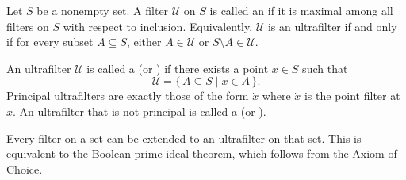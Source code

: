 \begin{definition} \label{definition:ultrafilter_on_a_set}

    Let $S$ be a nonempty set. A filter $\mathcal{U}$ on $S$ is called an  if it is maximal among all filters on $S$ with respect to inclusion. Equivalently, $\mathcal{U}$ is an ultrafilter if and only if for every subset $A \subseteq S$, either $A \in \mathcal{U}$ or $S \setminus A \in \mathcal{U}$.

    An ultrafilter $\mathcal{U}$ is called a  (or ) if there exists a point $x \in S$ such that
    $$\mathcal{U} = \{\, A \subseteq S \mid x \in A \,\}.$$
    Principal ultrafilters are exactly those of the form $\dot{x}$ where $\dot{x}$ is the point filter at $x$. An ultrafilter that is not principal is called a  (or ).

    Every filter on a set can be extended to an ultrafilter on that set. This is equivalent to the Boolean prime ideal theorem, which follows from the Axiom of Choice.
\end{definition}
